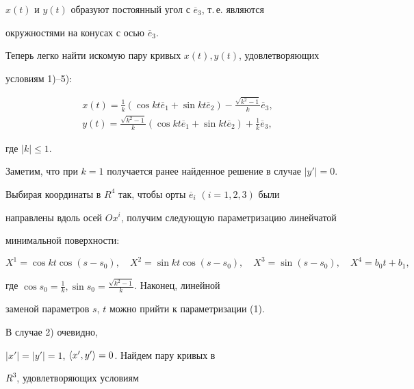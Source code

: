 \begin{pf}
$x(t)$ и $y(t)$ образуют постоянный угол с $ \overline e_3$, т.\,е. являются 


окружностями на конусах с осью $\overline e_3$. 


Теперь легко найти искомую пару кривых $x(t),y(t)$, удовлетворяющих 


условиям 1)--5):


\begin{gather*}


x(t)= \frac{1}{k}( \cos kt \overline e_1+ \sin kt \overline e_2)-


\frac{ \sqrt{ k^2-1}}{k} \overline e_3,\\


y(t)= \frac{ \sqrt{k^2-1}}{k}(\cos kt \overline e_1+ \sin kt \overline e_2)+


\frac{1}{k} \overline e_3,


\end{gather*}


где $|k| \leq 1$.


Заметим, что при $k=1$ получается ранее найденное решение в случае $|y'|=0$.











Выбирая координаты в $R^4$ так, чтобы орты $ \overline e_i$ $(i=1,2,3)$ были 


направлены вдоль осей $Ox^i$, получим следующую параметризацию линейчатой 


минимальной поверхности:


$$


X^1= \cos kt \cos (s-s_0),\quad X^2= \sin kt \cos(s-s_0),\quad X^3= \sin (s-s_0),


\quad X^4=b_0t+b_1,


$$  


где $\cos s_0= \frac{1}{k}, \sin s_0= \frac{ \sqrt{k^2-1}}{k}$. Наконец, линейной 


заменой параметров $s$, $t$ можно прийти к параметризации (1).





В случае 2) очевидно, 


$|x'|=|y'|=1$, $\langle x',y'\rangle=0$. Найдем пару кривых в  


$R^3$, удовлетворяющих условиям


\begin{equation}



\end{equation}
\end{pf}

